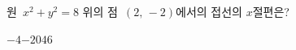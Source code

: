 원~$x^2+y^2=8$ 위의 점~$(2,\,-2)$에서의 접선의 $x$절편은?
\begin{choices32}{$-4$}{$-2$}{$0$}{$4$}{$6$}\end{choices32}

